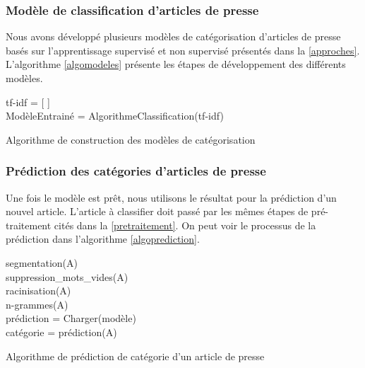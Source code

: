         \subsubsection{Modèle de classification d'articles de presse}
            Nous avons développé plusieurs modèles de catégorisation d'articles de presse basés sur l'apprentissage supervisé et non supervisé présentés dans la \autoref{approches}. L'algorithme \autoref{algomodeles} présente les étapes de développement des différents modèles.

            \begin{algorithm2e}[H]
            \label{algomodeles}
            \SetAlgoLined
            tf-idf = [ ]\\
            ModèleEntrainé = AlgorithmeClassification(tf-idf)\\
            \caption{Algorithme de construction des modèles de catégorisation}
            \end{algorithm2e}

        \subsubsection{Prédiction des catégories d'articles de presse}
            Une fois le modèle est prêt, nous utilisons le résultat pour la prédiction d'un nouvel article. L'article à classifier doit passé par les mêmes étapes de pré-traitement cités dans la \autoref{pretraitement}. On peut voir le processus de la prédiction dans l'algorithme \autoref{algoprediction}.

            \begin{algorithm2e}[H]
            \label{algoprediction}
            \SetAlgoLined
            segmentation(A)\\
            suppression\_mots\_vides(A)\\
            racinisation(A)\\
            n-grammes(A)\\
            prédiction = Charger(modèle)\\
            catégorie = prédiction(A)\\
            \caption{Algorithme de prédiction de catégorie d'un article de presse}
            \end{algorithm2e}

